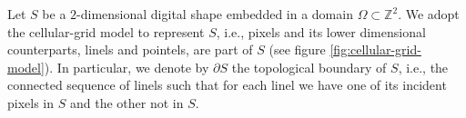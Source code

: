 Let $S$ be a $2$-dimensional digital shape embedded in a domain $\Omega \subset \mathbb{Z}^2$. We adopt the cellular-grid model to represent $S$, i.e., pixels and its lower dimensional counterparts, linels and pointels, are part of $S$ (see figure \ref{fig:cellular-grid-model}). In particular, we denote by $\partial S$ the topological boundary of $S$, i.e., the connected sequence of linels such that for each linel we have one of its incident pixels in $S$ and the other not in $S$.

\begin{figure}[h!]
	\center
	\hspace{40pt}%
\end{figure}
